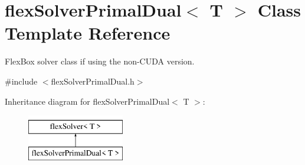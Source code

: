 \hypertarget{classflex_solver_primal_dual}{}\section{flex\+Solver\+Primal\+Dual$<$ T $>$ Class Template Reference}
\label{classflex_solver_primal_dual}


Flex\+Box solver class if using the non-\/\+C\+U\+DA version.  




{\ttfamily \#include $<$flex\+Solver\+Primal\+Dual.\+h$>$}

Inheritance diagram for flex\+Solver\+Primal\+Dual$<$ T $>$\+:\begin{figure}[H]
\begin{center}
\leavevmode
\includegraphics[height=2.000000cm]{classflex_solver_primal_dual}
\end{center}
\end{figure}
